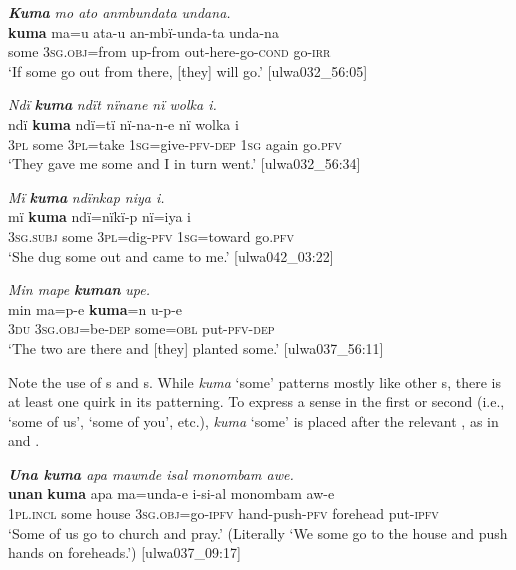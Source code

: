 \ea%
    \label{ex:det:194}
          \textbf{\textit{Kuma}} \textit{mo ato anmbundata undana.}\\
\gll    \textbf{kuma}  ma=u      ata-u    an-mbï-unda-ta  unda-na\\
    some  3\textsc{sg.obj}=from  up-from  out-here-go\textsc{{}-cond} go-\textsc{irr}\\
\glt `If some go out from there, [they] will go.’ [ulwa032\_56:05]
\z

\ea%
    \label{ex:det:195}
          \textit{Ndï} \textbf{\textit{kuma}} \textit{ndït nïnane nï wolka i.}\\
\gll    ndï  \textbf{kuma}  ndï=tï    nï-na-n-e        nï    wolka  i\\
    3\textsc{pl}  some  3\textsc{pl}=take  1\textsc{sg}=give-\textsc{pfv-dep}  1\textsc{sg}  again  go.\textsc{pfv}\\
\glt `They gave me some and I in turn went.’ [ulwa032\_56:34]
\z

\ea%
    \label{ex:det:196}
          \textit{Mï} \textbf{\textit{kuma}} \textit{ndïnkap niya i.}\\
\gll    mï      \textbf{kuma}  ndï=nïkï-p    nï=iya      i\\
    3\textsc{sg.subj}  some  3\textsc{pl}=dig-\textsc{pfv}  1\textsc{sg=}toward  go.\textsc{pfv}\\
\glt `She dug some out and came to me.’ [ulwa042\_03:22]
\z

\ea%
    \label{ex:det:197}
          \textit{Min mape} \textbf{\textit{kuman}} \textit{upe.}\\
\gll    min  ma=p-e      \textbf{kuma}=n  u-p-e\\
    3\textsc{du}  3\textsc{sg.obj}=be\textsc{{}-dep} some=\textsc{obl}  put-\textsc{pfv-dep}\\
\glt `The two are there and [they] planted some.’ [ulwa037\_56:11]
\z

Note the use of s and s. While \textit{kuma} ‘some’ patterns mostly like other s, there is at least one quirk in its  patterning. To express a  sense in the first  or second  (i.e., ‘some of us’, ‘some of you’, etc.), \textit{kuma} ‘some’ is placed after the relevant , as in  and .

\ea%
    \label{ex:det:198}
          \textit{\textbf{Una kuma} apa mawnde isal monombam awe.}\\
\gll    \textbf{unan}    \textbf{kuma}  apa    ma=unda-e    i-si{}-al monombam  aw-e\\
    1\textsc{pl.incl}  some  house  3\textsc{sg.obj}=go-\textsc{ipfv}  hand-push-\textsc{pfv}    forehead    put-\textsc{ipfv}\\
\glt `Some of us go to church and pray.’ (Literally ‘We some go to the house and push hands on foreheads.’) [ulwa037\_09:17]
\z

